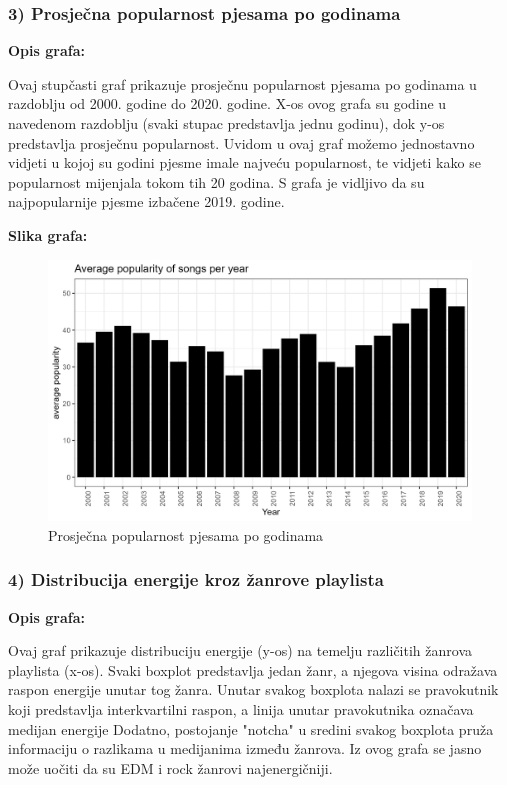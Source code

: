 	\subsubsection{3) Prosječna popularnost pjesama po godinama}
	
	\textbf{Opis grafa:}
	
	Ovaj stupčasti graf prikazuje prosječnu popularnost pjesama po godinama u razdoblju od 2000. godine do 2020. godine. X-os ovog grafa su godine u navedenom razdoblju (svaki stupac predstavlja jednu godinu), dok y-os predstavlja prosječnu popularnost. 
	Uvidom u ovaj graf možemo jednostavno vidjeti u kojoj su godini pjesme imale najveću popularnost, te vidjeti kako se popularnost mijenjala tokom tih 20 godina.
	S grafa je vidljivo da su najpopularnije pjesme izbačene 2019. godine.

	
	\textbf{Slika grafa:}
	\begin{figure}[H]
		\includegraphics[scale=0.9]{slike/Average popularity of songs per year.png}
		\centering
		\caption{Prosječna popularnost pjesama po godinama}
		
	\end{figure}
	
		\subsubsection{4) Distribucija energije kroz žanrove playlista}
	
	\textbf{Opis grafa:}
	
	Ovaj graf prikazuje distribuciju energije (y-os) na temelju različitih žanrova playlista (x-os). Svaki boxplot predstavlja jedan žanr, a njegova visina odražava raspon energije unutar tog žanra. Unutar svakog boxplota nalazi se pravokutnik koji predstavlja interkvartilni raspon, a linija unutar pravokutnika označava medijan energije
	Dodatno, postojanje "notcha" u sredini svakog boxplota pruža informaciju o razlikama u medijanima između žanrova.
	Iz ovog grafa se jasno može uočiti da su EDM i rock žanrovi najenergičniji.
	
